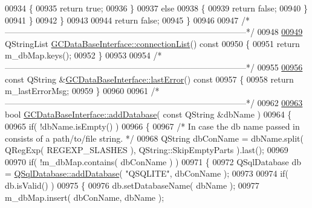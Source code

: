 \begin{DoxyCode}
{{{{{{{{{{{{{{{{{{{{{{{{{{{{{{{{{{00934       \{
00935         \textcolor{keywordflow}{return} \textcolor{keyword}{true};
00936       \}
00937       \textcolor{keywordflow}{else}
00938       \{
00939         \textcolor{keywordflow}{return} \textcolor{keyword}{false};
00940       \}
00941     \}
00942   \}
00943 
00944   \textcolor{keywordflow}{return} \textcolor{keyword}{false};
00945 \}
00946 
00947 \textcolor{comment}{/*
      --------------------------------------------------------------------------------------*/}
00948 
\hypertarget{gcdatabaseinterface_8cpp_source_l00949}{}\hyperlink{class_g_c_data_base_interface_ab34f716b89ee96de9bf599f5d5d2c152}{00949} QStringList \hyperlink{class_g_c_data_base_interface_ab34f716b89ee96de9bf599f5d5d2c152}{GCDataBaseInterface::connectionList}()\textcolor{keyword}{ const}
00950 \textcolor{keyword}{}\{
00951   \textcolor{keywordflow}{return} m\_dbMap.keys();
00952 \}
00953 
00954 \textcolor{comment}{/*
      --------------------------------------------------------------------------------------*/}
00955 
\hypertarget{gcdatabaseinterface_8cpp_source_l00956}{}\hyperlink{class_g_c_data_base_interface_a30d5bbea06462c5ed0f76ad8a68c4b08}{00956} \textcolor{keyword}{const} QString &\hyperlink{class_g_c_data_base_interface_a30d5bbea06462c5ed0f76ad8a68c4b08}{GCDataBaseInterface::lastError}()\textcolor{keyword}{ const}
00957 \textcolor{keyword}{}\{
00958   \textcolor{keywordflow}{return} m\_lastErrorMsg;
00959 \}
00960 
00961 \textcolor{comment}{/*
      --------------------------------------------------------------------------------------*/}
00962 
\hypertarget{gcdatabaseinterface_8cpp_source_l00963}{}\hyperlink{class_g_c_data_base_interface_a6b3cc67ba9e4bdf58b49869243446764}{00963} \textcolor{keywordtype}{bool} \hyperlink{class_g_c_data_base_interface_a6b3cc67ba9e4bdf58b49869243446764}{GCDataBaseInterface::addDatabase}( \textcolor{keyword}{const} QString &dbName )
00964 \{
00965   \textcolor{keywordflow}{if}( !dbName.isEmpty() )
00966   \{
00967     \textcolor{comment}{/* In case the db name passed in consists of a path/to/file string. */}
00968     QString dbConName = dbName.split( QRegExp( REGEXP\_SLASHES ), 
      QString::SkipEmptyParts ).last();
00969 
00970     \textcolor{keywordflow}{if}( !m\_dbMap.contains( dbConName ) )
00971     \{
00972       QSqlDatabase db = \hyperlink{class_g_c_data_base_interface_a6b3cc67ba9e4bdf58b49869243446764}{QSqlDatabase::addDatabase}( \textcolor{stringliteral}{"QSQLITE"}, dbConName );
00973 
00974       \textcolor{keywordflow}{if}( db.isValid() )
00975       \{
00976         db.setDatabaseName( dbName );
00977         m\_dbMap.insert( dbConName, dbName );
}}}}}}}}}}}}}}}}}}}}}}}}}}}}}}}}}}
\end{DoxyCode}
